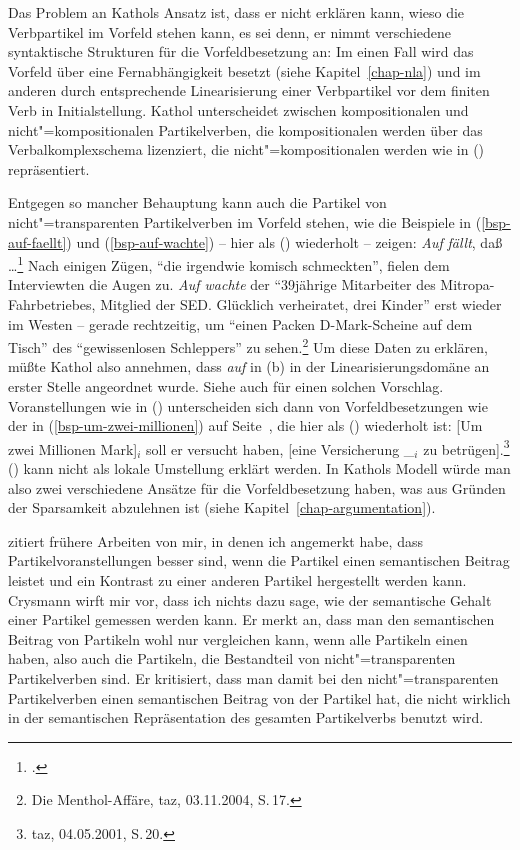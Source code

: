 Das Problem an Kathols Ansatz ist, dass er nicht erklären kann, wieso die Verbpartikel
im Vorfeld stehen kann, es sei denn, er nimmt verschiedene syntaktische Strukturen für die
Vorfeldbesetzung an: Im einen Fall wird das Vorfeld über eine Fernabhängigkeit
besetzt (siehe Kapitel~\ref{chap-nla}) und im anderen durch entsprechende Linearisierung einer
Verbpartikel vor dem finiten Verb in Initialstellung. Kathol unterscheidet zwischen kompositionalen
und nicht"=kompositionalen Partikelverben, die kompositionalen werden über das Verbalkomplexschema
lizenziert, die nicht"=kompositionalen werden wie in () repräsentiert.

Entgegen so mancher Behauptung kann auch die Partikel von nicht"=transparenten Partikelverben im
Vorfeld stehen, wie die Beispiele in (\ref{bsp-auf-faellt}) und (\ref{bsp-auf-wachte}) -- hier als ()
wiederholt -- zeigen:
\eal
\ex{}
\emph{Auf} \emph{fällt}, daß \ldots\footnote{
        .%
}
\ex Nach einigen Zügen, "`die irgendwie komisch schmeckten"', fielen dem Interviewten die Augen zu. 
\emph{Auf wachte} der "`39jährige Mitarbeiter des Mitropa-Fahrbetriebes, Mitglied der SED. Glücklich verheiratet, drei Kinder"'
erst wieder im Westen -- gerade rechtzeitig, um "`einen Packen D-Mark-Scheine auf dem Tisch"' 
des "`gewissenlosen Schleppers"' zu sehen.\footnote{
  Die Menthol-Affäre, taz, 03.11.2004, S.\,17.%
}
\zl
Um diese Daten zu erklären, müßte Kathol also annehmen, dass \emph{auf} in (b)
in der Linearisierungsdomäne an erster Stelle angeordnet wurde. Siehe auch 
für einen solchen Vorschlag.
Voranstellungen wie in () unterscheiden sich dann von Vorfeldbesetzungen wie der in 
(\ref{bsp-um-zwei-millionen}) auf Seite~\pageref{bsp-um-zwei-millionen},
die hier als () wiederholt ist:
\ea\label{bsp-um-zwei-millionen-zwei}
{}[Um zwei Millionen Mark]$_i$ soll er versucht haben, [eine Versicherung \_$_i$ zu betrügen].\footnote{
         taz, 04.05.2001, S.\,20.
}
\z
() kann nicht als lokale Umstellung erklärt werden.
In Kathols Modell würde man also zwei verschiedene Ansätze für die Vorfeldbesetzung haben,
was aus Gründen der Sparsamkeit abzulehnen ist (siehe Kapitel~\ref{chap-argumentation}).

\citet[Kapitel~4.2]{Crysmann2002a} zitiert frühere Arbeiten von mir, in denen ich angemerkt
habe, dass Partikelvoranstellungen besser sind, wenn die Partikel einen semantischen
Beitrag leistet und ein Kontrast zu einer anderen Partikel hergestellt werden kann.
\eal
{}
\zl
Crysmann wirft mir vor, dass ich nichts dazu sage, wie der semantische
Gehalt einer Partikel gemessen werden kann. Er merkt an, dass man den semantischen
Beitrag von Partikeln wohl nur vergleichen kann, wenn alle Partikeln einen
\contw haben, also auch die Partikeln, die Bestandteil von nicht"=transparenten
Partikelverben sind. Er kritisiert, dass man damit bei den nicht"=transparenten
Partikelverben einen semantischen Beitrag von der Partikel hat, die nicht wirklich
in der semantischen Repräsentation des gesamten Partikelverbs benutzt wird. 

